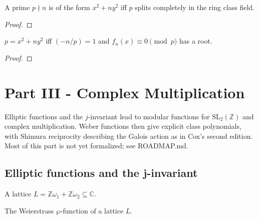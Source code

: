 \begin{theorem}
  \label{thm:main_splitting}
  \leanok
  A prime $p \nmid n$ is of the form $x^2 + n y^2$ iff $p$ splits completely in the
  ring class field.
\end{theorem}
\begin{proof}
\end{proof}

\begin{theorem}
  \label{thm:main_class_poly}
  \leanok
  $p = x^2 + n y^2$ iff $(-n/p) = 1$ and $f_n(x) \equiv 0 \pmod p$ has a root.
\end{theorem}
\begin{proof}
\end{proof}

\chapter{Part III - Complex Multiplication}

Elliptic functions and the $j$-invariant lead to modular functions for
$\mathrm{SL}_2(\mathbb Z)$ and complex multiplication. Weber functions then give
explicit class polynomials, with Shimura reciprocity describing the Galois
action as in Cox's second edition. Most of this part is not yet formalized;
see ROADMAP.md.

\section{Elliptic functions and the j-invariant}

\begin{definition}[Lattice]
  \label{def:lattice}
  \leanok
  A lattice $L = \mathbb Z\omega_1 + \mathbb Z\omega_2 \subseteq \mathbb C$.
\end{definition}

\begin{definition}[Weierstrass $\wp$]
  \label{def:weierstrass_p}
  \leanok
  The Weierstrass $\wp$-function of a lattice $L$.
\end{definition}

